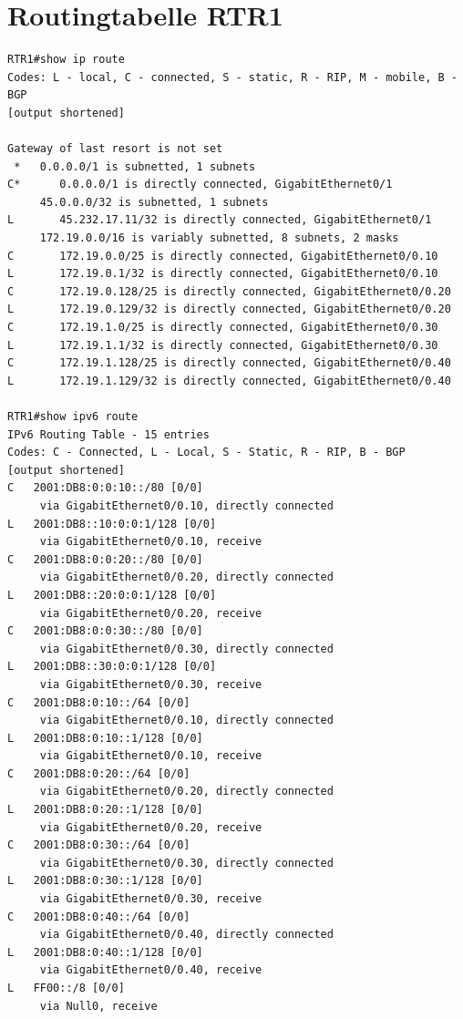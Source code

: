 \documentclass[11pt]{article}
\begin{document}
\section{Routingtabelle RTR1}
\label{sec:orgefc943e}
\begin{verbatim}
RTR1#show ip route
Codes: L - local, C - connected, S - static, R - RIP, M - mobile, B - BGP
[output shortened]

Gateway of last resort is not set
 *   0.0.0.0/1 is subnetted, 1 subnets
C*      0.0.0.0/1 is directly connected, GigabitEthernet0/1
     45.0.0.0/32 is subnetted, 1 subnets
L       45.232.17.11/32 is directly connected, GigabitEthernet0/1
     172.19.0.0/16 is variably subnetted, 8 subnets, 2 masks
C       172.19.0.0/25 is directly connected, GigabitEthernet0/0.10
L       172.19.0.1/32 is directly connected, GigabitEthernet0/0.10
C       172.19.0.128/25 is directly connected, GigabitEthernet0/0.20
L       172.19.0.129/32 is directly connected, GigabitEthernet0/0.20
C       172.19.1.0/25 is directly connected, GigabitEthernet0/0.30
L       172.19.1.1/32 is directly connected, GigabitEthernet0/0.30
C       172.19.1.128/25 is directly connected, GigabitEthernet0/0.40
L       172.19.1.129/32 is directly connected, GigabitEthernet0/0.40

RTR1#show ipv6 route
IPv6 Routing Table - 15 entries
Codes: C - Connected, L - Local, S - Static, R - RIP, B - BGP
[output shortened]
C   2001:DB8:0:0:10::/80 [0/0]
     via GigabitEthernet0/0.10, directly connected
L   2001:DB8::10:0:0:1/128 [0/0]
     via GigabitEthernet0/0.10, receive
C   2001:DB8:0:0:20::/80 [0/0]
     via GigabitEthernet0/0.20, directly connected
L   2001:DB8::20:0:0:1/128 [0/0]
     via GigabitEthernet0/0.20, receive
C   2001:DB8:0:0:30::/80 [0/0]
     via GigabitEthernet0/0.30, directly connected
L   2001:DB8::30:0:0:1/128 [0/0]
     via GigabitEthernet0/0.30, receive
C   2001:DB8:0:10::/64 [0/0]
     via GigabitEthernet0/0.10, directly connected
L   2001:DB8:0:10::1/128 [0/0]
     via GigabitEthernet0/0.10, receive
C   2001:DB8:0:20::/64 [0/0]
     via GigabitEthernet0/0.20, directly connected
L   2001:DB8:0:20::1/128 [0/0]
     via GigabitEthernet0/0.20, receive
C   2001:DB8:0:30::/64 [0/0]
     via GigabitEthernet0/0.30, directly connected
L   2001:DB8:0:30::1/128 [0/0]
     via GigabitEthernet0/0.30, receive
C   2001:DB8:0:40::/64 [0/0]
     via GigabitEthernet0/0.40, directly connected
L   2001:DB8:0:40::1/128 [0/0]
     via GigabitEthernet0/0.40, receive
L   FF00::/8 [0/0]
     via Null0, receive
\end{verbatim}
\end{document}
